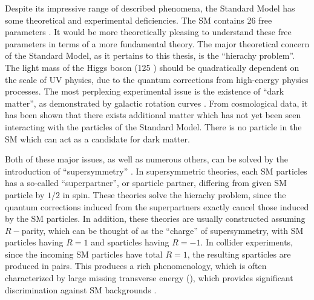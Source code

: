 Despite its impressive range of described phenomena, the Standard Model has some theoretical and experimental deficiencies.
The SM contains 26 free parameters \footnotemark.
It would be more theoretically pleasing to understand these free parameters in terms of a more fundamental theory.
The major theoretical concern of the Standard Model, as it pertains to this thesis, is the ``hierachy problem''\cite {Weinberg:1975gm,Weinberg:1979bn , Gildener:1976ai, Susskind:1978ms, susyPrimer}.
The light mass of the Higgs boson (125 \GeV) should be quadratically dependent on the scale of UV physics, due to the quantum corrections from high-energy physics processes.
The most perplexing experimental issue is the existence of ``dark matter'', as demonstrated by galactic rotation curves \cite{Rubin:1970zza, Roberts:1970zza, Rubin:1980zd, Rubin:1985ze, Bosma:1981zz, Persic:1995ru, darkMatterPrimer }.
From cosmological data, it has been shown that there exists additional matter which has not yet been seen interacting with the particles of the Standard Model.
There is no particle in the SM which can act as a candidate for dark matter.

Both of these major issues, as well as numerous others, can be solved by the introduction of ``supersymmetry'' \cite{Miyazawa:1966mfa, Gervais:1971xj , Gervais:1971ji, Golfand:1971iw , Neveu:1971rx, Neveu:1971iv, Volkov:1973ix ,  Wess:1973kz, Salam:1974ig, Ferrara:1974ac , Wess:1974tw,  susyPrimer}.
In supersymmetric theories, each SM particles has a so-called ``superpartner'', or sparticle partner, differing from given SM particle by $1/2$ in spin.
These theories solve the hierachy problem, since the quantum corrections induced from the superpartners exactly cancel those induced by the SM particles.
In addition, these theories are usually constructed assuming $R-$parity, which can be thought of as the ``charge'' of supersymmetry, with SM particles having $R=1$ and sparticles having $R=-1$.
In collider experiments, since the incoming SM particles have total $R=1$, the resulting sparticles are produced in pairs.
This produces a rich phenomenology, which is often characterized by large missing transverse energy (\met), which provides significant discrimination against SM backgrounds \cite{Farrar:1978xj}.

